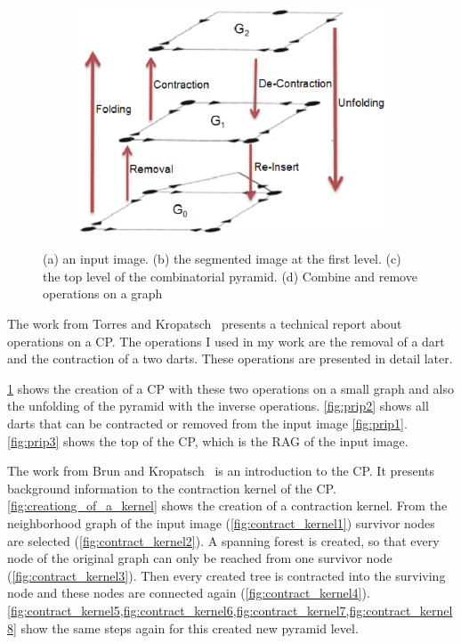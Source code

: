\documentclass[12pt]{article}
\begin{document}
\begin{figure}[tb]
    \begin{subfigure}[b]{0.4\textwidth}
        \includegraphics[width=\textwidth]{img/combine_remove.jpg}
        \caption{}\label{fig:combine_remove}
    \end{subfigure}

  \caption{(a) an input image. (b) the segmented image at the first level. (c) the top level of the combinatorial pyramid. (d) Combine and remove operations on a graph}\label{fig:prip}
\end{figure}

The work from Torres and Kropatsch~\cite{torrescanonical} presents a technical report about operations on a CP\@.
The operations I used in my work are the removal of a dart and the contraction of a two darts. These operations are presented in detail later.
\par
\cref{fig:combine_remove} shows the creation of a CP with these two operations on a small graph and also the unfolding of the pyramid with the inverse operations. \cref{fig:prip2} shows all darts that can be contracted or removed from the input image \cref{fig:prip1}. \cref{fig:prip3} shows the top of the CP, which is the RAG of the input image.
\par
The work from Brun and Kropatsch~\cite{brun2001introduction} is an introduction to the CP\@. It presents background information to the contraction
kernel of the CP\@. \cref{fig:creationg_of_a_kernel} shows the creation of a contraction kernel. From the neighborhood graph of the input image (\cref{fig:contract_kernel1}) survivor nodes are selected (\cref{fig:contract_kernel2}). A spanning forest is created, so that every node of the original graph can only be reached from one survivor node (\cref{fig:contract_kernel3}). Then every created tree is contracted into the surviving node and these nodes are connected again (\cref{fig:contract_kernel4}). \cref{fig:contract_kernel5,fig:contract_kernel6,fig:contract_kernel7,fig:contract_kernel8} show the same steps again for this created new pyramid level.
\par
\end{document}
